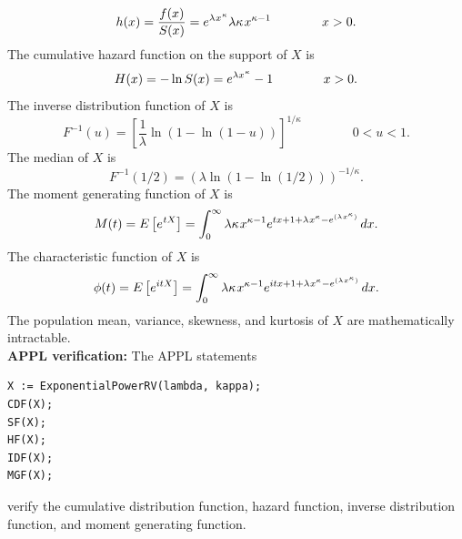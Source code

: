 \documentclass[12pt,fullpage]{article}
\begin{document}
$$
h(x) = \frac{f(x)}{S(x)} = e ^ {\lambda \kern 0.04 em x ^ {\kern 0.04 em\kappa}} \lambda \kappa \kern 0.08 em x ^ {\kappa - 1} \qquad \qquad x > 0.
$$
The cumulative hazard function on the support of $X$ is
$$
H(x) = - \ln S(x) =  e ^ {\lambda x ^ {\kern 0.04 em\kappa}} - 1 \qquad \qquad x > 0.
$$
The inverse distribution function of $X$ is
$$
F ^ {-1}(u) = \left[ \frac{1}{\lambda} \ln \left( 1 -  \ln(1-u) \right) \right] ^ {1/ \kappa} \qquad \qquad 0 < u < 1.
$$
The median of $X$ is 
$$
F ^ {-1}(1/2) = (\lambda \ln(1-\ln(1/2))) ^ {-1/ \kappa}.
$$
The moment generating function of $X$ is
$$
M(t) = E\left[ e ^ {\kern 0.04em tX} \right] = \displaystyle \int_0 ^\infty \lambda \kappa \kern 0.08 em x ^ {\kappa - 1}
e ^ {tx + 1 + \lambda \kern 0.04 em x ^ \kappa - e ^ {(\lambda \kern 0.04 em x ^ \kappa)}} \, dx.
$$
The characteristic function of $X$ is
$$
\phi(t) = E\left[ e ^ {itX} \right] =  \displaystyle \int_0 ^\infty \lambda \kappa \kern 0.08 em x ^ {\kappa - 1} e ^
{itx + 1 + \lambda \kern 0.04 em x ^ \kappa - e ^ {(\lambda \kern 0.04 em x ^ \kappa)}} \, dx.
$$
The population mean, variance, skewness, and kurtosis of $X$ are mathematically intractable.\\

\vspace{0.1in}
\noindent
{\bf APPL verification:}
The APPL statements
\begin{verbatim}
X := ExponentialPowerRV(lambda, kappa);
CDF(X);
SF(X);
HF(X);
IDF(X);
MGF(X);
\end{verbatim}
verify the cumulative distribution function, hazard function, inverse distribution function, and moment generating function.
\end{document}
